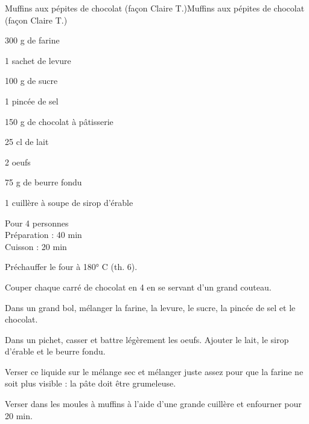 \begin{recette}{Muffins aux pépites de chocolat (façon Claire T.)}{Muffins aux pépites de chocolat (façon Claire T.)}

\begin{ingredients}
300 g de farine\par
1 sachet de levure\par
100 g de sucre\par
1 pincée de sel\par
150 g de chocolat à pâtisserie\par
25 cl de lait\par
2 oeufs\par
75 g de beurre fondu\par
1 cuillère à soupe de sirop d'érable\par
\end{ingredients}

\begin{infos}
Pour 4 personnes\\
Préparation : 40 min\\
Cuisson : 20 min\\
\end{infos}

\begin{etapes}
\item Préchauffer le four à 180° C (th. 6).
\item Couper chaque carré de chocolat en 4 en se servant d'un grand couteau.
\item Dans un grand bol, mélanger la farine, la levure, le sucre, la pincée de sel et le chocolat.
\item Dans un pichet, casser et battre légèrement les oeufs. Ajouter le lait, le sirop d'érable et le beurre fondu.
\item Verser ce liquide sur le mélange sec et mélanger juste assez pour que la farine ne soit plus visible : la pâte doit être grumeleuse.
\item Verser dans les moules à muffins à l'aide d'une grande cuillère et enfourner pour 20 min.
\end{etapes}

\end{recette}